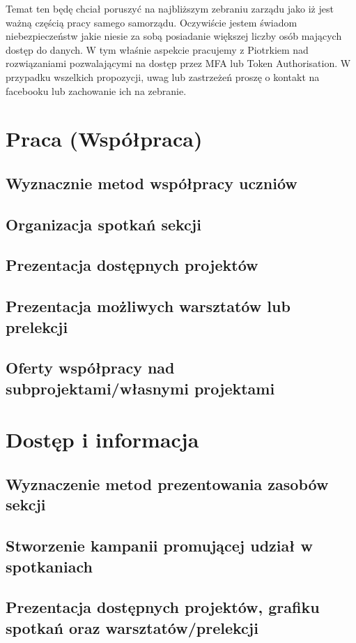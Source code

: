 \documentclass[9pt,a4paper]{report}
\begin{document}
Temat ten będę chciał poruszyć na najbliższym zebraniu zarządu jako iż jest ważną częścią pracy samego samorządu. Oczywiście jestem świadom niebezpieczeństw jakie niesie za sobą posiadanie większej liczby osób mających dostęp do danych. W tym właśnie aspekcie pracujemy z Piotrkiem nad rozwiązaniami pozwalającymi na dostęp przez MFA lub Token Authorisation. W przypadku wszelkich propozycji, uwag lub zastrzeżeń proszę o kontakt na facebooku lub zachowanie ich na zebranie.

\chapter{Praca (Współpraca)}

\section{Wyznacznie metod współpracy uczniów}
\section{Organizacja spotkań sekcji}
\section{Prezentacja dostępnych projektów}
\section{Prezentacja możliwych warsztatów lub prelekcji}
\section{Oferty współpracy nad subprojektami/własnymi projektami}

\chapter{Dostęp i informacja}

\section{Wyznaczenie metod prezentowania zasobów sekcji}
\section{Stworzenie kampanii promującej udział w spotkaniach}
\section{Prezentacja dostępnych projektów, grafiku spotkań oraz warsztatów/prelekcji}
\end{document}
